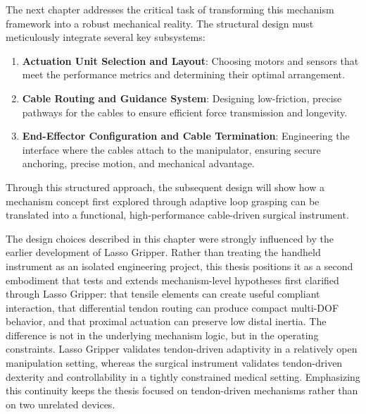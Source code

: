 The next chapter addresses the critical task of transforming this mechanism framework into a robust mechanical reality. The structural design must meticulously integrate several key subsystems:
\begin{enumerate}
    \item \textbf{Actuation Unit Selection and Layout}: Choosing motors and sensors that meet the performance metrics and determining their optimal arrangement.

    \item \textbf{Cable Routing and Guidance System}: Designing low-friction, precise pathways for the cables to ensure efficient force transmission and longevity.

    \item \textbf{End-Effector Configuration and Cable Termination}: Engineering the interface where the cables attach to the manipulator, ensuring secure anchoring, precise motion, and mechanical advantage.

\end{enumerate}


Through this structured approach, the subsequent design will show how a mechanism concept first explored through adaptive loop grasping can be translated into a functional, high-performance cable-driven surgical instrument.

The design choices described in this chapter were strongly influenced by the earlier development of Lasso Gripper. Rather than treating the handheld instrument as an isolated engineering project, this thesis positions it as a second embodiment that tests and extends mechanism-level hypotheses first clarified through Lasso Gripper: that tensile elements can create useful compliant interaction, that differential tendon routing can produce compact multi-DOF behavior, and that proximal actuation can preserve low distal inertia. The difference is not in the underlying mechanism logic, but in the operating constraints. Lasso Gripper validates tendon-driven adaptivity in a relatively open manipulation setting, whereas the surgical instrument validates tendon-driven dexterity and controllability in a tightly constrained medical setting. Emphasizing this continuity keeps the thesis focused on tendon-driven mechanisms rather than on two unrelated devices.
